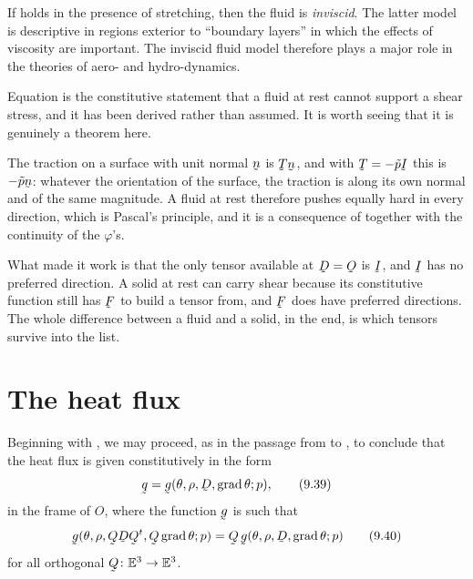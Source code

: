 If  holds in the presence of stretching, then the fluid is
\emph{inviscid}. The latter model is descriptive in regions exterior to
``boundary layers'' in which the effects of viscosity are important. The
inviscid fluid model therefore plays a major role in the theories of
aero- and hydro-dynamics.

\begin{remark}
\label{rem:ch9pressure}
Equation  is the constitutive statement that a fluid at rest
cannot support a shear stress, and it has been derived rather than
assumed. It is worth seeing that it is genuinely a theorem here.

The traction on a surface with unit normal $\bn$ is $\bT\bn$, and with
$\bT=-\tilde p\I$ this is $-\tilde p\bn$: whatever the orientation of
the surface, the traction is along its own normal and of the same
magnitude. A fluid at rest therefore pushes equally hard in every
direction, which is Pascal's principle, and it is a consequence of
 together with the continuity of the $\varphi$'s.

What made it work is that the only tensor available at $\bD=\Ob$ is
$\I$, and $\I$ has no preferred direction. A solid at rest can carry
shear because its constitutive function still has $\bF$ to build a
tensor from, and $\bF$ does have preferred directions. The whole
difference between a fluid and a solid, in the end, is which tensors
survive into the list.
\end{remark}
\section{The heat flux}\label{sec:ch9heat}

Beginning with , we may proceed, as in the passage from
 to , to conclude that the heat flux is given
constitutively in the form
\begin{equation}
   \bq=\bg(\theta,\rho,\bD,\grad\theta;p),
   \tag{9.39}\label{eq:9.39}
\end{equation}
in the frame of $O$, where the function $\bg$ is such that
\begin{equation}
   \bg(\theta,\rho,\bQ\bD\bQ^{t},\bQ\grad\theta;p)
   =\bQ\,\bg(\theta,\rho,\bD,\grad\theta;p)
   \tag{9.40}\label{eq:9.40}
\end{equation}
for all orthogonal $\bQ\colon\Et\to\Et$.


